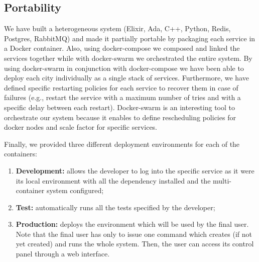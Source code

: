 \subsection{Portability}
We have built a heterogeneous system
(Elixir, Ada, C++, Python, Redis, Postgres, RabbitMQ)
and made it partially portable by packaging each service in a Docker
container.
Also, using docker-compose we composed and linked the services together while with docker-swarm
we orchestrated the entire system. By using docker-swarm in conjunction with docker-compose we
have been able to deploy each city individually as a single stack of services. Furthermore, we
have defined specific restarting policies for each service to recover them in case of failures
(e.g., restart the service with a maximum number of tries and with a specific delay between each restart).
Docker-swarm is an interesting tool to orchestrate our system because it enables to define rescheduling policies
for docker nodes and scale factor for specific services.

Finally, we provided three different deployment environments for each of the
containers:
\begin{enumerate}
  \item \textbf{Development:} allows the developer to
    log into the specific service as it were its local environment
    with all the dependency installed and the multi-container system
    configured;
  \item \textbf{Test:} automatically runs all the tests specified by
    the developer;
  \item \textbf{Production:} deploys the environment which will be used by
    the final user. Note that the final user has only to issue one command
    which creates (if not yet created) and runs the whole system.
    Then, the user can access its control panel through a web interface.
\end{enumerate}
